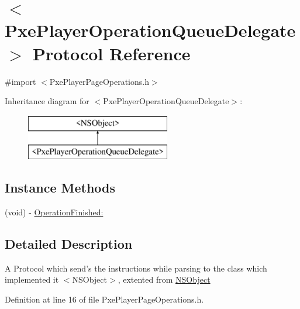\hypertarget{protocol_pxe_player_operation_queue_delegate-p}{\section{$<$Pxe\-Player\-Operation\-Queue\-Delegate$>$ Protocol Reference}
\label{protocol_pxe_player_operation_queue_delegate-p}
}


{\ttfamily \#import $<$Pxe\-Player\-Page\-Operations.\-h$>$}

Inheritance diagram for $<$Pxe\-Player\-Operation\-Queue\-Delegate$>$\-:\begin{figure}[H]
\begin{center}
\leavevmode
\includegraphics[height=2.000000cm]{protocol_pxe_player_operation_queue_delegate-p}
\end{center}
\end{figure}
\subsection*{Instance Methods}
\begin{DoxyCompactItemize}
\item 
(void) -\/ \hyperlink{protocol_pxe_player_operation_queue_delegate-p_a4a01f1612ffbce8c1076a67907d25110}{Operation\-Finished\-:}
\end{DoxyCompactItemize}


\subsection{Detailed Description}
A Protocol which send's the instructions while parsing to the class which implemented it  $<$\-N\-S\-Object$>$, extented from \hyperlink{class_n_s_object-p}{N\-S\-Object} 

Definition at line 16 of file Pxe\-Player\-Page\-Operations.\-h.



